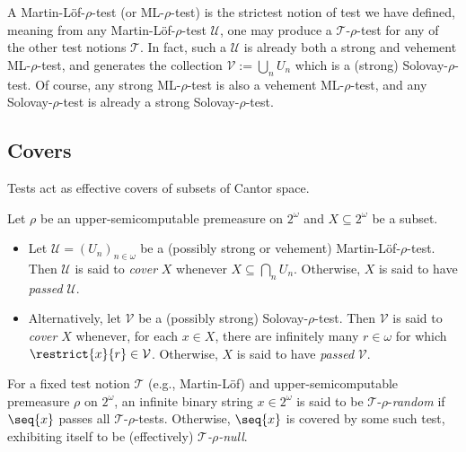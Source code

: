 A Martin-L{\"o}f-$\rho$-test (or ML-$\rho$-test) is the strictest notion of test we have defined, meaning from any Martin-L{\"o}f-$\rho$-test $\mathcal{U}$, one may produce a $\mathcal{T}$-$\rho$-test for any of the other test notions $\mathcal{T}$. In fact, such a $\mathcal{U}$ is already both a strong and vehement ML-$\rho$-test, and generates the collection $\mathcal{V} := \bigcup_n U_n$ which is a (strong) Solovay-$\rho$-test. Of course, any strong ML-$\rho$-test is also a vehement ML-$\rho$-test, and any Solovay-$\rho$-test is already a strong Solovay-$\rho$-test.
    
\subsection{Covers} 

Tests act as effective covers of subsets of Cantor space. 

\begin{definition}
    \label{definition:test_coverings}
    Let $\rho$ be an upper-semicomputable premeasure on $2^\omega$ and $X \subseteq 2^\omega$ be a subset. 
    \begin{itemize}
        \item Let $\mathcal{U} = (U_n)_{n \in \omega}$ be a (possibly strong or vehement) Martin-L{\"of}-$\rho$-test. Then $\mathcal{U}$ is said to \textit{cover} $X$ whenever $X \subseteq \bigcap_{n} U_n$. Otherwise, $X$ is said to have \textit{passed} $\mathcal{U}$.
        \item Alternatively, let $\mathcal{V}$ be a (possibly strong) Solovay-$\rho$-test. Then $\mathcal{V}$ is said to \textit{cover} $X$ whenever, for each $x \in X$, there are infinitely many $r \in \omega$ for which $\restrict{x}{r} \in \mathcal{V}$. Otherwise, $X$ is said to have \textit{passed} $\mathcal{V}$.
    \end{itemize}
\end{definition}

For a fixed test notion $\mathcal{T}$ (e.g., Martin-L{\"o}f) and upper-semicomputable premeasure $\rho$ on $2^\omega$, an infinite binary string $x \in 2^\omega$ is said to be $\mathcal{T}$-$\rho$-\textit{random} if $\seq{x}$ passes all $\mathcal{T}$-$\rho$-tests. Otherwise, $\seq{x}$ is covered by some such test, exhibiting itself to be (effectively) \textit{$\mathcal{T}$-$\rho$-null}. 

